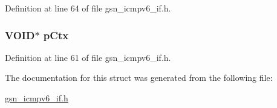 Definition at line 64 of file gsn\_\-icmpv6\_\-if.h.

\hypertarget{a00202_a5ef049defd7cc5565bb3c81588802ef7}{
\subsubsection[{pCtx}]{\setlength{\rightskip}{0pt plus 5cm}VOID$\ast$ {\bf pCtx}}}
\label{a00202_a5ef049defd7cc5565bb3c81588802ef7}


Definition at line 61 of file gsn\_\-icmpv6\_\-if.h.



The documentation for this struct was generated from the following file:\begin{DoxyCompactItemize}
\item 
\hyperlink{a00517}{gsn\_\-icmpv6\_\-if.h}\end{DoxyCompactItemize}
